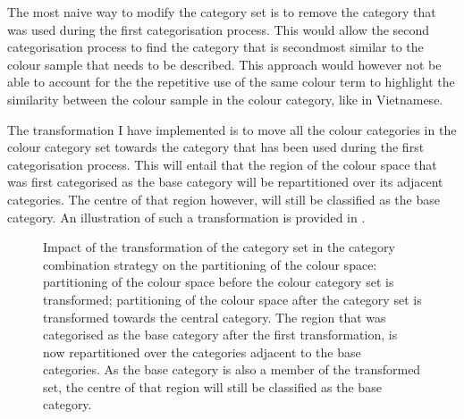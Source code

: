 The most naive way to modify the category set is to remove the
category that was used during the first categorisation process. This
would allow the second categorisation process to find the category
that is secondmost similar to the colour sample that needs to be
described. This approach would however not be able to account for the
the repetitive use of the same colour term to highlight the similarity
between the colour sample in the colour category, like in Vietnamese.

The transformation I have implemented is to move all the colour
categories in the colour category set towards the category that has
been used during the first categorisation process. This will entail
that the region of the colour space that was first categorised as the
base category will be repartitioned over its adjacent categories. The
centre of that region however, will still be classified as the base
category. An illustration of such a transformation is provided in
.

\begin{figure}[htbp]
\centering
{}
\caption[Impact of the transformation of the category set in the
category combination strategy on the partitioning of the colour
space]{Impact of the transformation of the category set in the
  category combination strategy on the partitioning of the
  colour space: 
  partitioning of the colour space before the colour category set is
  transformed;  partitioning of
  the colour space after the category set is transformed towards the
  central category. The region that was categorised as
  the base category after the first transformation, is now repartitioned over the categories adjacent
  to the base categories. As the base category is also a member of the
  transformed set, the centre of that region will still be classified
  as the base category.}
\label{f:ccs-semantics-transformation}
\end{figure}

